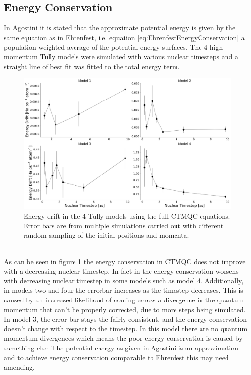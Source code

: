 \subsection{Energy Conservation}
In Agostini \cite{agostini_quantum-classical_2016} it is stated that the approximate potential energy is given by the same equation as in Ehrenfest, i.e. equation \eqref{eq:EhrenfestEnergyConservation} a population weighted average of the potential energy surfaces. The 4 high momentum Tully models were simulated with various nuclear timesteps and a straight line of best fit was fitted to the total energy term.
\begin{figure}[ht]
  \includegraphics[width=\textwidth]{../img/CTMQC/TullyModels/CTMQC_EnerCons.png}
  \caption{\label{fig:CTMQC_EnergyCons}Energy drift in the 4 Tully models using the full CTMQC equations. Error bars are from multiple simulations carried out with different random sampling of the initial positions and momenta.}
\end{figure}
\\
As can be seen in figure \ref{fig:CTMQC_EnergyCons} the energy conservation in CTMQC does not improve with a decreasing nuclear timestep. In fact in the energy conservation worsens with decreasing nuclear timestep in some models such as model 4. Additionally, in models two and four the errorbar increases as the timestep decreases. This is caused by an increased likelihood of coming across a divergence in the quantum momentum that can't be properly corrected, due to more steps being simulated. In model 3, the error bar stays the fairly consistent, and the energy conservation doesn't change with respect to the timestep. In this model there are no quantum momentum divergences which means the poor energy conservation is caused by something else. The potential energy as given in Agostini \cite{agostini_quantum-classical_2016} is an approximation and to achieve energy conservation comparable to Ehrenfest this may need amending.

